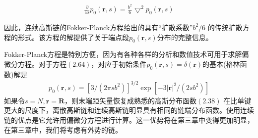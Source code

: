 \begin{gather}
\frac{\partial}{\partial s}p_0(\mathbf{r},s)=\frac{b^2}{6}\bigtriangledown ^2 p_0(\mathbf{r},s)
\end{gather}

因此，连续高斯链的Fokker-Planck方程给出的具有“扩散系数”$b^2/6$
的传统扩散方程的形式。该方程的解提供了关于端点段$p_0(\mathbf{r},s)$分布的完整信息。

Fokker-Planck方程是特别方便，因为有各种各样的分析和数值技术可用于求解偏微分方程。对于方程$(2.64)$，对应于初始条件$p_0(\mathbf{r},s)=\delta(\mathbf{r})$的基本(格林函数)解是
\begin{gather}
p_0(\mathbf{r},s)=\left[ 3/(2 \pi sb^2) \right]^{3/2}\exp \left[ -3\left| \mathbf{r} \right|^2/(2sb^2) \right]
\end{gather}
如果令$s=N,\mathbf{r}=\mathbf{R}$，则末端距矢量恢复成熟悉的高斯分布函数$(2.38)$
在比单键更大的尺度下，离散高斯链和连续高斯链明显具有相同的链端分布函数。使用连续链的优点是它允许用偏微分方程进行计算。这一优势将在第三章中变得更加明显，在第三章中，我们将考虑有外势的链。
\endinput